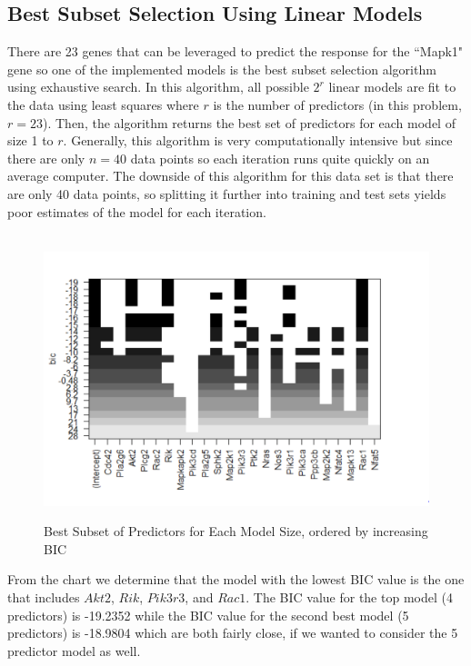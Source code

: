 \documentclass{article}
\begin{document}
\subsection{Best Subset Selection Using Linear Models}
There are 23 genes that can be leveraged to predict the response for the ``Mapk1" gene so one of the implemented models is the best subset selection algorithm using exhaustive search.  In this algorithm, all possible $2^r$ linear models are fit to the data using least squares where $r$ is the number of predictors (in this problem, $r=23$).  Then, the algorithm returns the best set of predictors for each model of size 1 to $r$.  Generally, this algorithm is very computationally intensive but since there are only $n=40$ data points so each iteration runs quite quickly on an average computer.  The downside of this algorithm for this data set is that there are only 40 data points, so splitting it further into training and test sets yields poor estimates of the model for each iteration. \\
\null\\
\begin{figure}[H]
	\caption{Best Subset of Predictors for Each Model Size, ordered by increasing BIC}
	\includegraphics[scale=0.60]{best_subsets}
	\centering
	\label{fig:best_subsets}
\end{figure}
From the chart we determine that the model with the lowest BIC value is the one that includes $Akt2$, $Rik$, $Pik3r3$, and $Rac1$.  The BIC value for the top model (4 predictors) is  -19.2352 while the BIC value for the second best model (5 predictors) is -18.9804 which are both fairly close, if we wanted to consider the 5 predictor model as well.\\
\null\\
\end{document}
